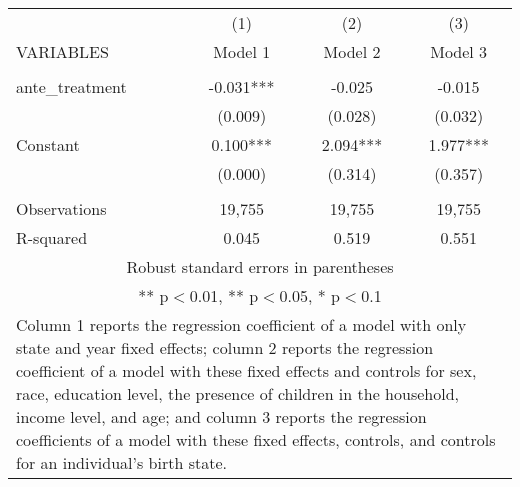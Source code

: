 \begin{tabular}{lccc}
\hline
 & (1) & (2) & (3) \\
VARIABLES & Model 1 & Model 2 & Model 3 \\ \hline
 &  &  &  \\
ante\_treatment & -0.031*** & -0.025 & -0.015 \\
 & (0.009) & (0.028) & (0.032) \\
Constant & 0.100*** & 2.094*** & 1.977*** \\
 & (0.000) & (0.314) & (0.357) \\
 &  &  &  \\
Observations & 19,755 & 19,755 & 19,755 \\
 R-squared & 0.045 & 0.519 & 0.551 \\ \hline
\multicolumn{4}{c}{\small Robust standard errors in parentheses} \\
\multicolumn{4}{c}{\small *** p$<$0.01, ** p$<$0.05, * p$<$0.1} \\
\multicolumn{4}{p{0.8\linewidth}}{\small Column 1 reports the
regression coefficient of a model with only state and year fixed effects; column 2 reports the
regression coefficient of a model with these fixed effects and controls for sex, race, education
level, the presence of children in the household, income level, and age; and column 3 reports
the regression coefficients of a model with these fixed effects, controls, and controls for an
individual’s birth state.} \\
\end{tabular}
